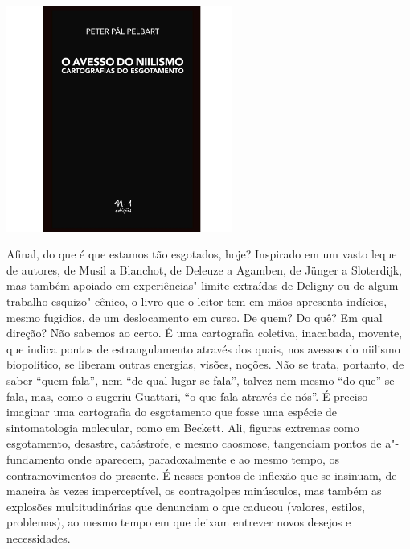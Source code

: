 \pagebreak

\begin{center}
\hspace*{.5cm}\includegraphics[width=74mm]{./CAPAS/pelbart.jpg}
\end{center}

\hspace*{-7cm}\hrulefill\hspace*{-7cm}

\medskip

\noindent{}Afinal, do que é que estamos tão esgotados, hoje? Inspirado em um vasto leque de autores, de Musil a Blanchot, de Deleuze a Agamben, de Jünger a Sloterdijk, mas também apoiado em experiências"-limite extraídas de Deligny ou de algum trabalho esquizo"-cênico, o livro que o leitor tem em mãos apresenta indícios, mesmo fugidios, de um deslocamento em curso. De quem? Do quê? Em qual direção? Não sabemos ao certo. É uma cartografia coletiva, inacabada, movente, que indica pontos de estrangulamento através dos quais, nos avessos do niilismo biopolítico, se liberam outras energias, visões, noções. Não se trata, portanto, de saber ``quem fala'', nem ``de qual lugar se fala'', talvez nem mesmo ``do que'' se fala, mas, como o sugeriu Guattari, ``o que fala através de nós''. É preciso imaginar uma cartografia do esgotamento que fosse uma espécie de sintomatologia molecular, como em Beckett. Ali, figuras extremas como esgotamento, desastre, catástrofe, e mesmo caosmose, tangenciam pontos de a"-fundamento onde aparecem, paradoxalmente e ao mesmo tempo, os contramovimentos do presente. É nesses pontos de inflexão que se insinuam, de maneira às vezes imperceptível, os contragolpes minúsculos, mas também as explosões multitudinárias que denunciam o que caducou (valores, estilos, problemas), ao mesmo tempo em que deixam entrever novos desejos e necessidades.

